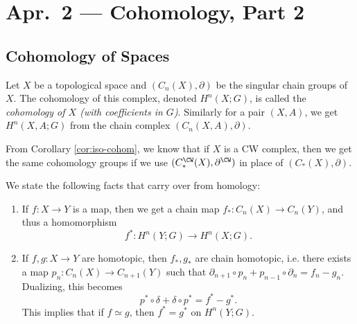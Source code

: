 \chapter{Apr.~2 --- Cohomology, Part 2}

\section{Cohomology of Spaces}

\begin{definition}
  Let $X$ be a topological space and
  $(C_n(X), \partial)$ be the singular chain groups
  of $X$. The cohomology of this complex, denoted
  $H^n(X; G)$, is
  called the \emph{cohomology of $X$ (with coefficients in $G$)}.
  Similarly for a pair $(X, A)$, we get $H^n(X, A; G)$
  from the chain complex $(C_n(X, A), \partial)$.
\end{definition}

\begin{remark}
  From Corollary \ref{cor:iso-cohom}, we know that
  if $X$ is a CW complex, then we get the same
  cohomology groups if we use
  $(C_*^\CW(X), \partial^\CW)$ in place of
  $(C_*(X), \partial)$.
\end{remark}

\begin{remark}
  We state the following facts that carry over from
  homology:
  \begin{enumerate}
    \item If $f : X \to Y$ is a map, then
      we get a chain map $f_* : C_n(X) \to C_n(Y)$,
      and thus a homomorphism
      \[
        f^* : H^n(Y; G) \to H^n(X; G).
      \]
    \item If $f, g : X \to Y$ are homotopic, then
      $f_*, g_*$ are chain homotopic, i.e. there
      exists a map $p_n : C_n(X) \to C_{n + 1}(Y)$
      such that $\partial_{n + 1} \circ p_n + p_{n - 1} \circ \partial_n = f_n - g_n$.
      Dualizing, this becomes
      \[p^* \circ \delta + \delta \circ p^* = f^* - g^*.\]
      This implies that if $f \simeq g$, then
      $f^* = g^*$ on $H^n(Y; G)$.
  \end{enumerate}
\end{remark}

